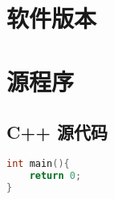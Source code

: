 \documentclass{cumcmthesis}
\begin{document}
\newpage
\begin{appendices}
	\section{软件版本}

	\section{源程序}
	\subsection*{C++ 源代码}
	\begin{lstlisting}[language=c++]
int main(){
	return 0;
}
\end{lstlisting}

\end{appendices}
\end{document}
